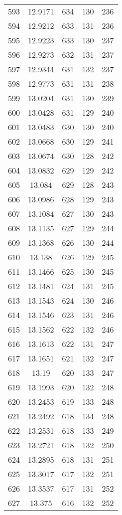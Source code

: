 \documentclass[12pt,a4paper]{article}
\begin{document}
\begin{tabular}{r|cccc}
	593 & 12.9171 & 634 & 130 & 236 \\
	594 & 12.9212 & 633 & 131 & 236 \\
	595 & 12.9223 & 633 & 130 & 237 \\
	596 & 12.9273 & 632 & 131 & 237 \\
	597 & 12.9344 & 631 & 132 & 237 \\
	598 & 12.9773 & 631 & 131 & 238 \\
	599 & 13.0204 & 631 & 130 & 239 \\
	600 & 13.0428 & 631 & 129 & 240 \\
	601 & 13.0483 & 630 & 130 & 240 \\
	602 & 13.0668 & 630 & 129 & 241 \\
	603 & 13.0674 & 630 & 128 & 242 \\
	604 & 13.0832 & 629 & 129 & 242 \\
	605 & 13.084 & 629 & 128 & 243 \\
	606 & 13.0986 & 628 & 129 & 243 \\
	607 & 13.1084 & 627 & 130 & 243 \\
	608 & 13.1135 & 627 & 129 & 244 \\
	609 & 13.1368 & 626 & 130 & 244 \\
	610 & 13.138 & 626 & 129 & 245 \\
	611 & 13.1466 & 625 & 130 & 245 \\
	612 & 13.1481 & 624 & 131 & 245 \\
	613 & 13.1543 & 624 & 130 & 246 \\
	614 & 13.1546 & 623 & 131 & 246 \\
	615 & 13.1562 & 622 & 132 & 246 \\
	616 & 13.1613 & 622 & 131 & 247 \\
	617 & 13.1651 & 621 & 132 & 247 \\
	618 & 13.19 & 620 & 133 & 247 \\
	619 & 13.1993 & 620 & 132 & 248 \\
	620 & 13.2453 & 619 & 133 & 248 \\
	621 & 13.2492 & 618 & 134 & 248 \\
	622 & 13.2531 & 618 & 133 & 249 \\
	623 & 13.2721 & 618 & 132 & 250 \\
	624 & 13.2895 & 618 & 131 & 251 \\
	625 & 13.3017 & 617 & 132 & 251 \\
	626 & 13.3537 & 617 & 131 & 252 \\
	627 & 13.375 & 616 & 132 & 252 \\

\end{tabular}
\end{document}
